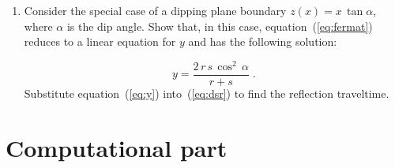 \begin{enumerate}
\begin{enumerate}
    \item Consider the special case of a dipping plane boundary $z(x)
    = x\,\tan{\alpha}$, where $\alpha$ is the dip angle. Show that, in
    this case, equation~(\ref{eq:fermat}) reduces to a linear equation
    for $y$ and has the following solution:

    \begin{equation}
      y = {\frac{2\,r\,s\,\cos^2\,\alpha}{r + s}}\;.
      \label{eq:y}
    \end{equation}
    Substitute equation~(\ref{eq:y}) into~(\ref{eq:dsr}) to find the 
    reflection traveltime.
  \end{enumerate}
\end{enumerate}

\section{Computational part}

